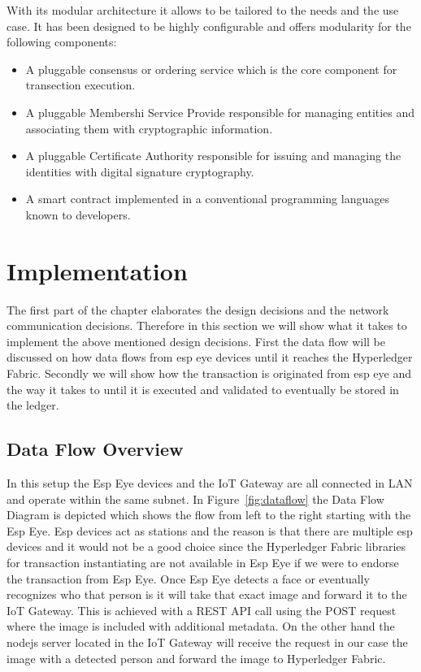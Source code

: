 With its modular architecture it allows to be tailored to the needs and the use case. It has been designed to be highly configurable and offers modularity for the following components: 

\begin{itemize}
    \item A pluggable consensus or ordering service which is the core component for transection execution.
    \item A pluggable Membershi Service Provide responsible for managing entities and associating them with cryptographic information.
    \item A pluggable Certificate Authority responsible for issuing and managing the identities with digital signature cryptography.
     \item A smart contract implemented in a conventional programming languages known to developers. 
    
\end{itemize}



\section{Implementation}

The first part of the chapter elaborates the design decisions and the network communication decisions. Therefore in this section we will show what it takes to implement the above mentioned design decisions. First the data flow will be discussed on how data flows from esp eye devices until it reaches the Hyperledger Fabric. Secondly we will show how the transaction is originated from esp eye and the way it takes to until it is executed and validated to eventually be stored in the ledger.  

\subsection{Data Flow Overview}

In this setup the Esp Eye devices and the IoT Gateway are all connected in LAN and operate within the same subnet. In Figure~\ref{fig:dataflow} the Data Flow Diagram is depicted which shows the flow from left to the right starting with the Esp Eye. Esp devices act as stations and the reason is that there are multiple esp devices and it would not be a good choice since the Hyperledger Fabric libraries for transaction instantiating are not available in Esp Eye if we were to endorse the transaction from Esp Eye. Once Esp Eye detects a face or eventually recognizes who that person is it will take that exact image and forward it to the IoT Gateway. This is achieved with a REST API call using the POST request where the image is included with additional metadata. On the other hand the nodejs server located in the IoT Gateway will receive the request in our case the image with  a detected person and forward the image to Hyperledger Fabric. 

